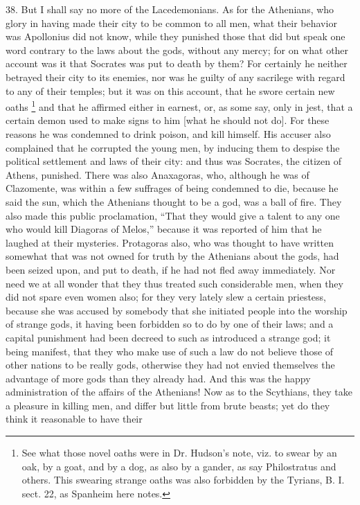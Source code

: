 38. But I shall say no more of the Lacedemonians. As for the Athenians,
who glory in having made their city to be common to all men, what their
behavior was Apollonius did not know, while they punished those that did
but speak one word contrary to the laws about the gods, without any mercy;
for on what other account was it that Socrates was put to death by them?
For certainly he neither betrayed their city to its enemies, nor was he
guilty of any sacrilege with regard to any of their temples; but it was on
this account, that he swore certain new oaths \footnote{See what those novel
oaths were in Dr. Hudson's note, viz. to swear by an oak, by a goat, and
by a dog, as also by a gander, as say Philostratus and others. This
swearing strange oaths was also forbidden by the Tyrians, B. I. sect. 22,
as Spanheim here notes.} and that
he affirmed either in earnest, or, as some say, only in jest, that a
certain demon used to make signs to him [what he should not do]. For these
reasons he was condemned to drink poison, and kill himself. His accuser
also complained that he corrupted the young men, by inducing them to
despise the political settlement and laws of their city: and thus was
Socrates, the citizen of Athens, punished. There was also Anaxagoras, who,
although he was of Clazomente, was within a few suffrages of being
condemned to die, because he said the sun, which the Athenians thought to
be a god, was a ball of fire. They also made this public proclamation,
``That they would give a talent to any one who would kill Diagoras of
Melos,'' because it was reported of him that he laughed at their mysteries.
Protagoras also, who was thought to have written somewhat that was not
owned for truth by the Athenians about the gods, had been seized upon, and
put to death, if he had not fled away immediately. Nor need we at all
wonder that they thus treated such considerable men, when they did not
spare even women also; for they very lately slew a certain priestess,
because she was accused by somebody that she initiated people into the
worship of strange gods, it having been forbidden so to do by one of their
laws; and a capital punishment had been decreed to such as introduced a
strange god; it being manifest, that they who make use of such a law do
not believe those of other nations to be really gods, otherwise they had
not envied themselves the advantage of more gods than they already had.
And this was the happy administration of the affairs of the Athenians! Now
as to the Scythians, they take a pleasure in killing men, and differ but
little from brute beasts; yet do they think it reasonable to have their
